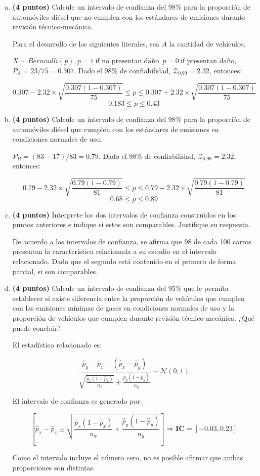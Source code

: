 \documentclass[../main.tex]{subfiles}
\begin{document}
\begin{enumerate}[(a)]

\item \textbf{(4 puntos)} Calcule un intervalo de confianza del 98\% para la proporción de automóviles diésel que no cumplen con los estándares de emisiones durante revisión técnico-mecánica.

Para el desarrollo de los siguientes literales, sea $A$ la cantidad de vehículos.

$X \sim Bernoulli(p), p = 1\ \text{if no presentan daño}\;\ p = 0\ \text{if presentan daño}$, $P_A = 23 / 75 = 0.307$. Dado el 98\% de confiabilidad, $\mathcal{Z}_{0.99} = 2.32$, entonces:

$$0.307 - 2.32 \times \sqrt{\frac{0.307(1-0.307)}{75}} \leq p \leq 0.307 + 2.32 \times \sqrt{\frac{0.307(1-0.307)}{75}}$$
$$0.183 \leq p \leq 0.43$$

\item \textbf{(4 puntos)} Calcule un intervalo de confianza del 98\% para la proporción de automóviles diésel que cumplen con los estándares de emisiones en condiciones normales de uso.

$P_B = (83-17) / 83 = 0.79$. Dado el 98\% de confiabilidad, $\mathcal{Z}_{0.99} = 2.32$, entonces:

$$0.79 - 2.32 \times \sqrt{\frac{0.79(1-0.79)}{81}} \leq p \leq 0.79 + 2.32 \times \sqrt{\frac{0.79(1-0.79)}{81}}$$
$$0.68 \leq p \leq 0.89$$

\item \textbf{(4 puntos)} Interprete los dos intervalos de confianza construidos en los puntos anteriores e indique si estos son comparables. Justifique su respuesta.

De acuerdo a los intervalos de confianza, se afirma que 98 de cada 100 carros presentan la característica relacionada a su estudio en el intervalo relacionado. Dado que el segundo está contenido en el primero de forma parcial, si son comparables.

\item \textbf{(4 puntos)} Calcule un intervalo de confianza del 95\% que le permita establecer si existe diferencia entre la proporción de vehículos que cumplen con las emisiones mínimas de gases en condiciones normales de uso y la proporción de vehículos que cumplen durante revisión
técnico-mecánica. ¿Qué puede concluir?

El estadístico relacionado es:

$$\frac{\hat{p}_y - \hat{p}_x - (\hat{p}_x - \hat{p}_y)}{\sqrt{\frac{\hat{p}_x(1 - \hat{p}_x)}{n_x}} + \frac{\hat{p}_y(1 - \hat{p}_y)}{n_y}} \sim \mathcal{N}(0, 1)$$

El intervalo de confianza es generado por:

$$\left[ \hat{p}_x - \hat{p}_x \pm  \sqrt{\frac{\hat{p}_x(1 - \hat{p}_x)}{n_x} + \frac{\hat{p}_y(1 - \hat{p}_y)}{n_y}}\right] \Rightarrow \textbf{IC} = [-0.03, 0.23]$$

Como el intervalo incluye el número cero, no es posible afirmar que ambas proporciones son distintas.

\end{enumerate}
\end{document}
